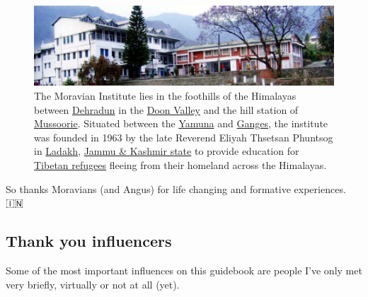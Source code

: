 \documentclass[
]{book}
\begin{document}
\begin{figure}

{\centering \includegraphics[width=1\linewidth]{images/moravian-insitute} 

}

\caption{The Moravian Institute lies in the foothills of the Himalayas between \href{https://en.wikipedia.org/wiki/Dehradun}{Dehradun} in the \href{https://en.wikipedia.org/wiki/Doon_Valley}{Doon Valley} and the hill station of \href{https://en.wikipedia.org/wiki/Mussoorie}{Mussoorie}. Situated between the \href{https://en.wikipedia.org/wiki/Yamuna}{Yamuna} and \href{https://en.wikipedia.org/wiki/Ganges}{Ganges}, the institute was founded in 1963 by the late Reverend Eliyah Thsetsan Phuntsog in \href{https://en.wikipedia.org/wiki/Ladakh}{Ladakh}, \href{https://en.wikipedia.org/wiki/Jammu_and_Kashmir_(state)}{Jammu \& Kashmir state} to provide education for \href{https://en.wikipedia.org/wiki/Tibetan_diaspora}{Tibetan refugees} fleeing from their homeland across the Himalayas.}\label{fig:moravian-fig}
\end{figure}



So thanks Moravians (and Angus) for life changing and formative experiences. 🇮🇳🙏

\hypertarget{influences}{%
\subsection{Thank you influencers}\label{influences}}

Some of the most important influences on this guidebook are people I've only met very briefly, virtually or not at all (yet).
\end{document}
